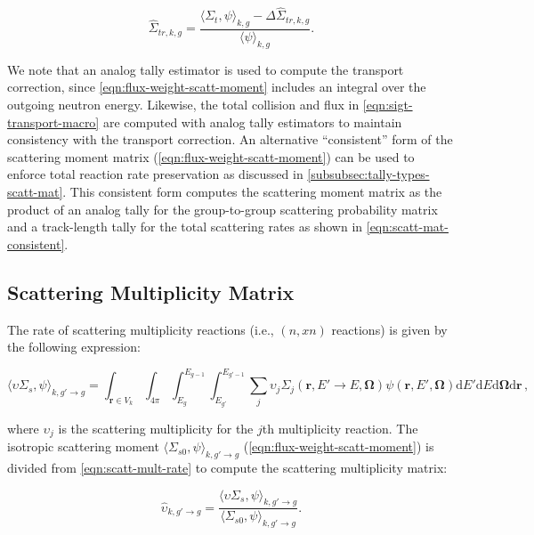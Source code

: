 \begin{equation}
\label{eqn:sigt-transport-macro}
\hat{\Sigma}_{tr,k,g} = \frac{\langle \Sigma_{t}, \psi \rangle_{k,g} - \Delta\hat{\Sigma}_{tr,k,g}}{\langle \psi \rangle_{k,g}}.
\end{equation}

We note that an analog tally estimator is used to compute the transport correction, since \cref{eqn:flux-weight-scatt-moment} includes an integral over the outgoing neutron energy. Likewise, the total collision and flux in \cref{eqn:sigt-transport-macro} are computed with analog tally estimators to maintain consistency with the transport correction. An alternative ``consistent'' form of the scattering moment matrix (\cref{eqn:flux-weight-scatt-moment}) can be used to enforce total reaction rate preservation as discussed in \cref{subsubsec:tally-types-scatt-mat}. This consistent form computes the scattering moment matrix as the product of an analog tally for the group-to-group scattering probability matrix and a track-length tally for the total scattering rates as shown in \cref{eqn:scatt-mat-consistent}.

\subsection{Scattering Multiplicity Matrix}
\label{subsubsec:tally-types-mult-mat}

The rate of scattering multiplicity reactions (\textrm{i.e.}, $(n,xn)$ reactions) is given by the following expression:

\begin{equation}
\label{eqn:scatt-mult-rate}
\langle \upsilon \Sigma_{s}, \psi \rangle_{k,g'\rightarrow g} = \int_{\mathbf{r} \in V_{k}} \int_{4\pi} \int_{E_g}^{E_{g-1}} \int_{E_{g'}}^{E_{g'-1}} \sum_j \upsilon_j \Sigma_j (\mathbf{r}, E' \rightarrow E, \mathbf{\Omega}) \psi(\mathbf{r}, E', \mathbf{\Omega}) \mathrm{d}E'\mathrm{d}E\mathrm{d}\mathbf{\Omega}\mathrm{d}\mathbf{r}\,,
\end{equation}

\noindent where $\upsilon_j$ is the scattering multiplicity for the $j$th multiplicity reaction. The isotropic scattering moment $\langle \Sigma_{s0}, \psi \rangle_{k,g'\rightarrow g}$ (\cref{eqn:flux-weight-scatt-moment}) is divided from \cref{eqn:scatt-mult-rate} to compute the scattering multiplicity matrix:

\begin{equation}
\label{eqn:scatt-mult-mat}
\hat{\upsilon}_{k,g'\rightarrow g} = \frac{{\langle \upsilon \Sigma_{s}, \psi \rangle}_{k,g'\rightarrow g}}{{\langle \Sigma_{s0}, \psi \rangle}_{k,g'\rightarrow g}}.
\end{equation}


